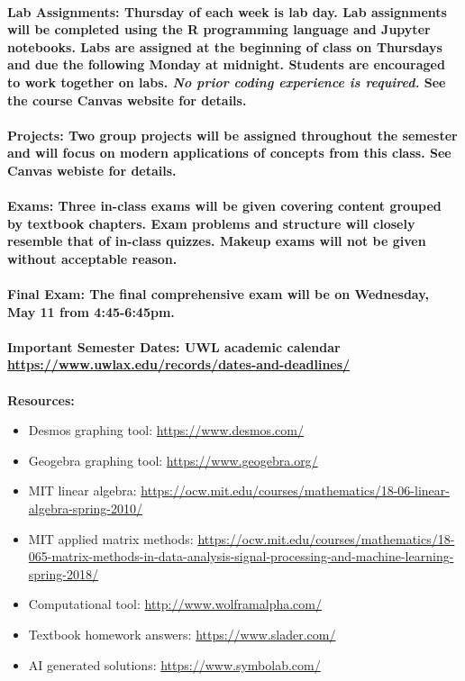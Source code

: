 \documentclass [11pt]{article}
\begin{document}
\ \\
\bfseries Lab Assignments: \normalfont Thursday of each week is lab day. Lab assignments will be completed using the R programming language and Jupyter notebooks. Labs are assigned at the beginning of class on Thursdays and due the following Monday at midnight. Students are encouraged to work together on labs. \emph{No prior coding experience is required.} See the course Canvas website for details. \normalfont \\
\ \\
\bfseries Projects: \normalfont  Two group projects will be assigned throughout the semester and will focus on modern applications of concepts from this class. See Canvas webiste for details.  \normalfont \\
\ \\
\bfseries Exams: \normalfont Three in-class exams will be given covering content grouped by textbook chapters. Exam problems and structure will closely resemble that of in-class quizzes. Makeup exams will not be given without acceptable reason. \\
\ \\
\bfseries Final Exam: \normalfont The final comprehensive exam will be on {\bf Wednesday, May 11 from 4:45-6:45pm}.  \\
\ \\
\bfseries Important Semester Dates: \normalfont UWL academic calendar \\ \url{https://www.uwlax.edu/records/dates-and-deadlines/} \\
\ \\
\bfseries Resources: \normalfont 
\begin{itemize}
\setlength{\itemsep}{1pt}
\setlength{\parskip}{0pt}
\setlength{\parsep}{0pt}
\setlength{\itemsep}{1pt}
\setlength{\parskip}{0pt}
\setlength{\parsep}{0pt}
\item Desmos graphing tool: \url{https://www.desmos.com/}
\item Geogebra graphing tool: \url{https://www.geogebra.org/}
\item MIT linear algebra: \url{https://ocw.mit.edu/courses/mathematics/18-06-linear-algebra-spring-2010/}
\item MIT applied matrix methods: \url{https://ocw.mit.edu/courses/mathematics/18-065-matrix-methods-in-data-analysis-signal-processing-and-machine-learning-spring-2018/}
\item Computational tool: \url{http://www.wolframalpha.com/}
\item Textbook homework answers: \url{https://www.slader.com/}
\item AI generated solutions: \url{https://www.symbolab.com/}
\end{itemize}
\end{document}
